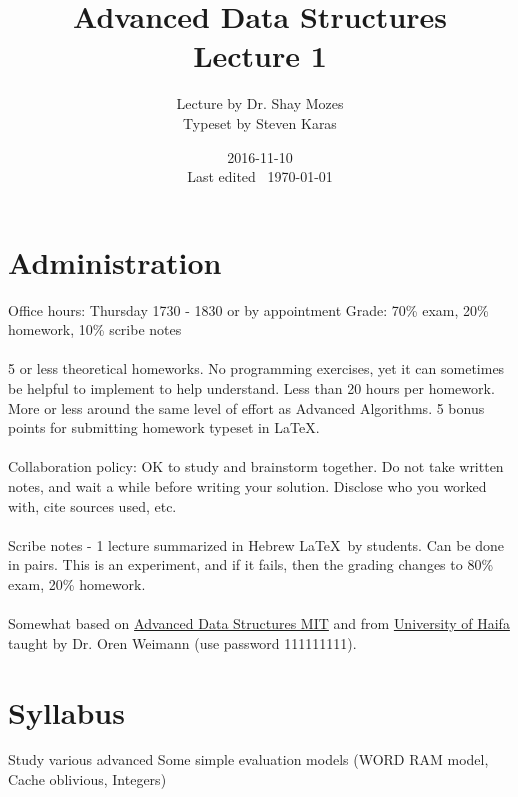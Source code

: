 \documentclass[a4paper]{article}
\title{Advanced Data Structures\\\large Lecture 1}
\date{2016-11-10 \\ Last edited \currenttime\ \today}
\author{Lecture by Dr. Shay Mozes\\Typeset by Steven Karas}
\begin{document}
\maketitle

\section{Administration}

Office hours: Thursday 1730 - 1830 or by appointment
Grade: 70\% exam, 20\% homework, 10\% scribe notes

\paragraph{}
5 or less theoretical homeworks. No programming exercises, yet it can sometimes be helpful to implement to help understand. Less than 20 hours per homework. More or less around the same level of effort as Advanced Algorithms. 5 bonus points for submitting homework typeset in \LaTeX.

\paragraph{}
Collaboration policy: OK to study and brainstorm together. Do not take written notes, and wait a while before writing your solution. Disclose who you worked with, cite sources used, etc.

\paragraph{}
Scribe notes - 1 lecture summarized in Hebrew \LaTeX\ by students. Can be done in pairs. This is an experiment, and if it fails, then the grading changes to 80\% exam, 20\% homework.

\paragraph{}
Somewhat based on \href{http://courses.csail.mit.edu/6.851/}{Advanced Data Structures MIT}
and from \href{http://moodle.haifa.ac.il/course/view.php?id=3538}{University of Haifa} taught by Dr. Oren Weimann (use password 111111111).

\section{Syllabus}

Study various advanced 
Some simple evaluation models (WORD RAM model, Cache oblivious, Integers)
\end{document}
